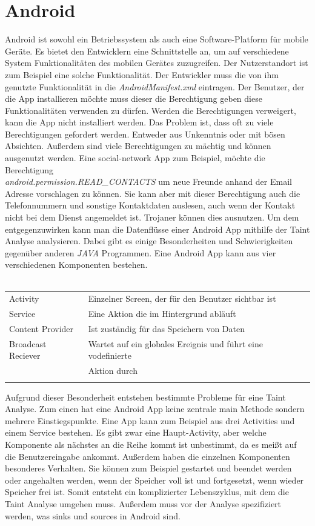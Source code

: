 \documentclass[runningheads]{llncs}
\begin{document}
\section{Android}
Android ist sowohl ein Betriebssystem als auch eine Software-Platform für mobile Geräte. Es bietet den Entwicklern eine Schnittstelle an, um auf verschiedene System Funktionalitäten des mobilen Gerätes zuzugreifen. Der Nutzerstandort ist zum Beispiel eine solche Funktionalität. Der Entwickler muss die von ihm genutzte Funktionalität in die \emph{AndroidManifest.xml} eintragen. Der Benutzer, der die App installieren möchte muss dieser die Berechtigung geben diese Funktionalitäten verwenden zu dürfen. Werden die Berechtigungen verweigert, kann die App nicht installiert werden. Das Problem ist, dass oft zu viele Berechtigungen gefordert werden. Entweder aus Unkenntnis oder mit bösen Absichten. Außerdem sind viele Berechtigungen zu mächtig und können ausgenutzt werden. Eine social-network App zum Beispiel, möchte die Berechtigung\\\emph{android.permission.READ\_CONTACTS} um neue Freunde anhand der Email Adresse vorschlagen zu können. Sie kann aber mit dieser Berechtigung auch die Telefonnummern und sonstige Kontaktdaten auslesen, auch wenn der Kontakt nicht bei dem Dienst angemeldet ist. Trojaner können dies ausnutzen. Um dem entgegenzuwirken kann man die Datenflüsse einer Android App mithilfe der Taint Analyse analysieren. Dabei gibt es einige Besonderheiten und Schwierigkeiten gegenüber anderen \emph{JAVA} Programmen. Eine Android App kann aus vier verschiedenen Komponenten bestehen.\\\\
\begin{tabular}{ll}
	Activity & Einzelner Screen, der für den Benutzer sichtbar ist\\
	Service & Eine Aktion die im Hintergrund abläuft\\
	Content Provider & Ist zuständig für das Speichern von Daten\\
	Broadcast Reciever & Wartet auf ein globales Ereignis und führt eine vodefinierte \\
	& Aktion durch\\\\
\end{tabular}
Aufgrund dieser Besonderheit entstehen bestimmte Probleme für eine Taint Analyse. Zum einen hat eine Android App keine zentrale main Methode sondern mehrere Einstiegspunkte. Eine App kann zum Beispiel aus drei Activities und einem Service bestehen. Es gibt zwar eine Haupt-Activity, aber welche Komponente als nächstes an die Reihe kommt ist unbestimmt, da es meißt auf die Benutzereingabe ankommt. Außerdem haben die einzelnen Komponenten besonderes Verhalten. Sie können zum Beispiel gestartet und beendet werden oder angehalten werden, wenn der Speicher voll ist und fortgesetzt, wenn wieder Speicher frei ist. Somit entsteht ein komplizierter Lebenszyklus, mit dem die Taint Analyse umgehen muss. Außerdem muss vor der Analyse spezifiziert werden, was sinks und sources in Android sind.
\end{document}
